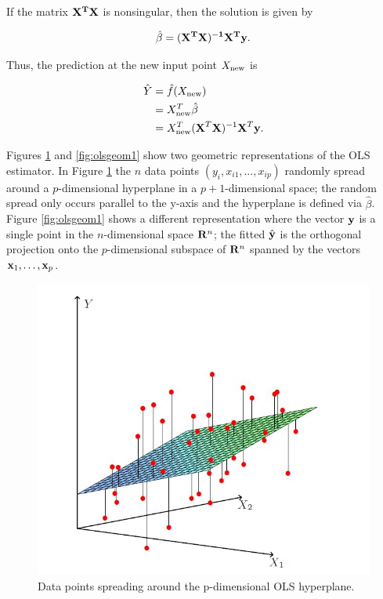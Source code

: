\documentclass[
]{book}
\begin{document}
If the matrix \(\bf X^T \bf X\) is nonsingular, then the solution is given by

\[\hat\beta=(\bf X^T \bf X)^{-1}\bf X^T \bf y.\]

Thus, the prediction at the new input point \(X_{\rm new}\) is

\begin{align*}
\hat{Y}&=\hat{f}(X_{\rm new})\\
&=X_{\rm new}^T\hat\beta\\
&=X_{\rm new}^T(\textbf{X}^T \textbf{X})^{-1}\textbf{X}^T \textbf{y}.
\end{align*}

Figures \ref{fig:olsgeom2} and \ref{fig:olsgeom1} show two geometric representations of the OLS estimator. In Figure \ref{fig:olsgeom2} the \(n\) data points \((y_i,x_{i1},\ldots,x_{ip})\) randomly spread around a \(p\)-dimensional hyperplane in a \(p+1\)-dimensional space; the random spread only occurs parallel to the y-axis and the hyperplane is defined via \(\hat \beta\). Figure \ref{fig:olsgeom1} shows a different representation where the vector \(\bf y\) is a single point in the \(n\)-dimensional space \({\bf R}^n\); the fitted \(\hat {\bf y}\) is the orthogonal projection onto the \(p\)-dimensional subspace of \({\bf R}^n\) spanned by the vectors \({\bf x}_1,\ldots,{\bf x}_p\).

\begin{figure}

{\centering \includegraphics[width=0.8\linewidth]{ols_geom2} 

}

\caption{Data points spreading around the p-dimensional OLS hyperplane.}\label{fig:olsgeom2}
\end{figure}
\end{document}
